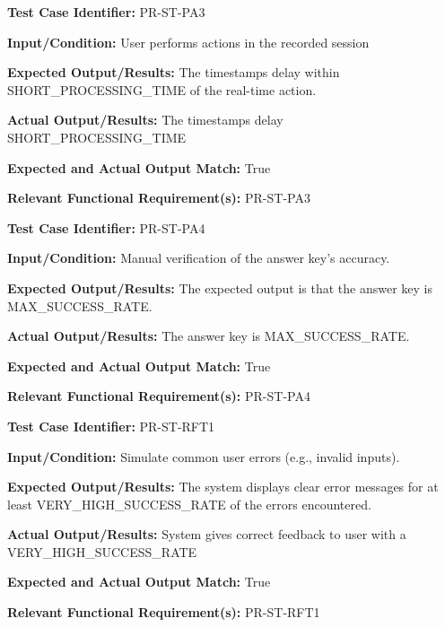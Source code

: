 \documentclass[12pt, titlepage]{article}
\begin{document}
\begin{mdframed}[linewidth=0.5mm]
  \textbf{Test Case Identifier:} PR-ST-PA3 \par
  \textbf{Input/Condition:} User performs actions in the recorded session \par
  \textbf{Expected Output/Results:} The timestamps delay within \\SHORT\_PROCESSING\_TIME of the real-time action. \par
  \textbf{Actual Output/Results:} The timestamps delay \\SHORT\_PROCESSING\_TIME  \par
  \textbf{Expected and Actual Output Match:} True \par
  \textbf{Relevant Functional Requirement(s):} PR-ST-PA3
\end{mdframed}

\begin{mdframed}[linewidth=0.5mm]
  \textbf{Test Case Identifier:} PR-ST-PA4 \par
  \textbf{Input/Condition:} Manual verification of the answer key’s accuracy. \par
  \textbf{Expected Output/Results:} The expected output is that the answer key is \\MAX\_SUCCESS\_RATE. \par
  \textbf{Actual Output/Results:} The answer key is MAX\_SUCCESS\_RATE.  \par
  \textbf{Expected and Actual Output Match:} True \par
  \textbf{Relevant Functional Requirement(s):} PR-ST-PA4
\end{mdframed}

\begin{mdframed}[linewidth=0.5mm]
  \textbf{Test Case Identifier:} PR-ST-RFT1 \par
  \textbf{Input/Condition:} Simulate common user errors (e.g., invalid inputs). \par
  \textbf{Expected Output/Results:} The system displays clear error messages for at least VERY\_HIGH\_SUCCESS\_RATE of the errors encountered. \par
  \textbf{Actual Output/Results:} System gives correct feedback to user with a \\VERY\_HIGH\_SUCCESS\_RATE \par
  \textbf{Expected and Actual Output Match:} True \par
  \textbf{Relevant Functional Requirement(s):} PR-ST-RFT1
\end{mdframed}
\end{document}
